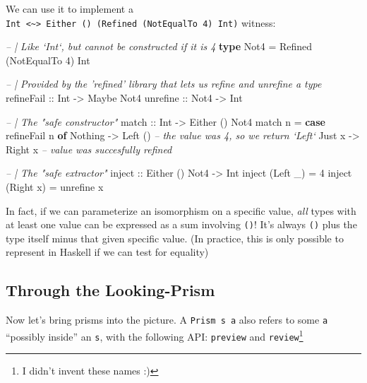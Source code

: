 \documentclass[]{article}
\newenvironment{Shaded}{}{}
\newcommand{\CommentTok}[1]{\textcolor[rgb]{0.38,0.63,0.69}{\textit{#1}}}
\newcommand{\DataTypeTok}[1]{\textcolor[rgb]{0.56,0.13,0.00}{#1}}
\newcommand{\DecValTok}[1]{\textcolor[rgb]{0.25,0.63,0.44}{#1}}
\newcommand{\FunctionTok}[1]{\textcolor[rgb]{0.02,0.16,0.49}{#1}}
\newcommand{\KeywordTok}[1]{\textcolor[rgb]{0.00,0.44,0.13}{\textbf{#1}}}
\newcommand{\NormalTok}[1]{#1}
\newcommand{\OtherTok}[1]{\textcolor[rgb]{0.00,0.44,0.13}{#1}}
\begin{document}
We can use it to implement a
\texttt{Int\ \textless{}\textasciitilde{}\textgreater{}\ Either\ ()\ (Refined\ (NotEqualTo\ 4)\ Int)}
witness:

\begin{Shaded}
\begin{Highlighting}[]
\CommentTok{-- | Like `Int`, but cannot be constructed if it is 4}
\KeywordTok{type} \DataTypeTok{Not4} \FunctionTok{=} \DataTypeTok{Refined}\NormalTok{ (}\DataTypeTok{NotEqualTo} \DecValTok{4}\NormalTok{) }\DataTypeTok{Int}

\CommentTok{-- | Provided by the 'refined' library that lets us refine and unrefine a type}
\OtherTok{refineFail ::} \DataTypeTok{Int}  \OtherTok{->} \DataTypeTok{Maybe} \DataTypeTok{Not4}
\OtherTok{unrefine   ::} \DataTypeTok{Not4} \OtherTok{->} \DataTypeTok{Int}


\CommentTok{-- | The "safe constructor"}
\OtherTok{match ::} \DataTypeTok{Int} \OtherTok{->} \DataTypeTok{Either}\NormalTok{ () }\DataTypeTok{Not4}
\NormalTok{match n }\FunctionTok{=} \KeywordTok{case}\NormalTok{ refineFail n }\KeywordTok{of}
    \DataTypeTok{Nothing} \OtherTok{->} \DataTypeTok{Left}\NormalTok{ ()          }\CommentTok{-- the value was 4, so we return `Left`}
    \DataTypeTok{Just}\NormalTok{ x  }\OtherTok{->} \DataTypeTok{Right}\NormalTok{ x          }\CommentTok{-- value was succesfully refined}

\CommentTok{-- | The "safe extractor"}
\OtherTok{inject ::} \DataTypeTok{Either}\NormalTok{ () }\DataTypeTok{Not4} \OtherTok{->} \DataTypeTok{Int}
\NormalTok{inject (}\DataTypeTok{Left}\NormalTok{  _) }\FunctionTok{=} \DecValTok{4}
\NormalTok{inject (}\DataTypeTok{Right}\NormalTok{ x) }\FunctionTok{=}\NormalTok{ unrefine x}
\end{Highlighting}
\end{Shaded}

In fact, if we can parameterize an isomorphism on a specific value, \emph{all}
types with at least one value can be expressed as a sum involving \texttt{()}!
It's always \texttt{()} plus the type itself minus that given specific value.
(In practice, this is only possible to represent in Haskell if we can test for
equality)

\hypertarget{through-the-looking-prism}{%
\subsection{Through the Looking-Prism}\label{through-the-looking-prism}}

Now let's bring prisms into the picture. A
\texttt{Prism\textquotesingle{}\ s\ a} also refers to some \texttt{a} ``possibly
inside'' an \texttt{s}, with the following API: \texttt{preview} and
\texttt{review}\footnote{I didn't invent these names :)}
\end{document}
